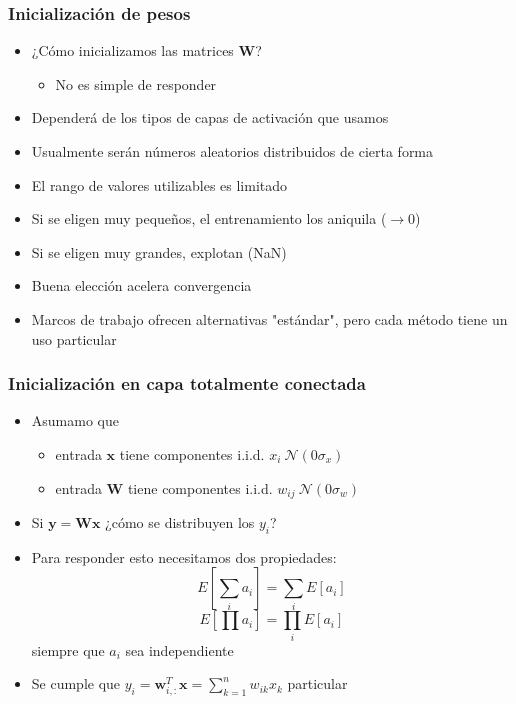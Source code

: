 \documentclass[svgnames,12pt,aspectratio=149]{beamer}
\begin{document}
\begin{frame}
  \frametitle{Inicialización de pesos}
\begin{itemize}
 \item ¿Cómo inicializamos las matrices $\boldsymbol{W}$?
 \begin{itemize}
 \item No es simple  de responder
 \end{itemize}
 \item Dependerá de los tipos de capas de activación que usamos
 \item Usualmente serán números aleatorios distribuidos de cierta forma 
 \item El rango de valores utilizables es limitado
 \item Si se eligen muy pequeños, el entrenamiento los aniquila ($\rightarrow 0$)
 \item Si se eligen muy grandes, explotan (NaN)
 \item Buena elección acelera convergencia 
 \item Marcos de trabajo ofrecen alternativas "estándar", pero cada método tiene un uso particular  
 \end{itemize}
  
\end{frame}
\begin{frame}
  \frametitle{Inicialización en capa totalmente conectada}
\begin{itemize}
 \item Asumamo que 
 \begin{itemize}
 \item entrada  $\boldsymbol{x}$ tiene componentes i.i.d.  $x_i~\mathcal{N}(0\sigma_x)$
 \item entrada  $\boldsymbol{W}$ tiene componentes i.i.d.  $w_{ij}~\mathcal{N}(0\sigma_w)$
 \end{itemize}
 \item Si $\boldsymbol{y}=\boldsymbol{W}\boldsymbol{x}$ ¿cómo se distribuyen los $y_i$?
 \item Para responder esto necesitamos dos propiedades: 
 \begin{equation*}
  E\left[   \sum_i a_i    \right] =\sum_i E \left[  a_i \right] 
 \end{equation*}
  \begin{equation*}
  E\left[   \prod a_i    \right] =\prod_i E \left[  a_i \right] 
 \end{equation*}
 siempre que $a_i$ sea independiente 
 \item Se cumple que $y_i=\boldsymbol{w}_{i,:}^T\boldsymbol{x}= \sum_{k=1}^{n}w_{ik}x_k$
 particular
 \end{itemize}
  
\end{frame}
\end{document}
